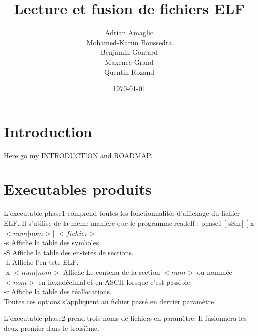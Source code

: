 \documentclass[10pt,oneside]{article}   %
\begin{document}
\title{Lecture et fusion de fichiers ELF}           %
\author{Adrian Amaglio\\Mohamed-Karim Boussedra\\Benjamin Gontard\\Maxence Grand\\Quentin Rozand}
\date{\today}
\maketitle
\tableofcontents


\section*{Introduction}\label{sec-intro}
  Here go my INTRODUCTION and ROADMAP.

\section{Executables produits}
	L'executable phase1 comprend toutes les fonctionnalités d'affichage du fichier ELF. Il s'utilise de la meme manière que le programme readelf \cite{readelf}:
		phase1 [-sShr] [-x $<num|nom>$] $<fichier>$\\
		-s Affiche la table des symboles\\
		-S Affiche la table des en-tetes de sections.\\
		-h Affiche l'en-tete ELF.\\
		-x $<num|nom>$ Affiche Le contenu de la section $<num>$ ou nommée $<nom>$ en hexadécimal et en ASCII lorsque c'est possible.\\
		-r Affiche la table des réallocations.\\
	Toutes ces options s'appliquent au fichier passé en dernier paramètre.

	L'executable phase2 prend trois noms de fichiers en paramètre. Il fusionnera les deux premier dans le troisième.
\end{document}
